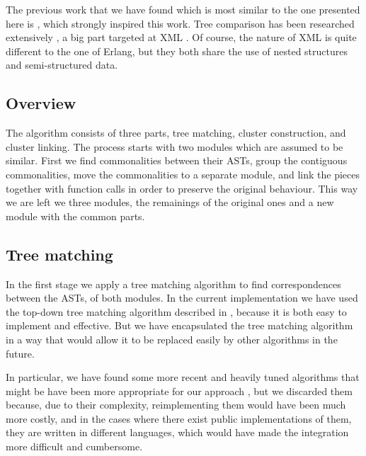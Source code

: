 The previous work that we have found which is most similar to the
one presented here is \cite{chawathe1996change}, which strongly
inspired this work. Tree comparison has been researched extensively
\cite{bille2005survey}, a big part targeted at XML \cite{peters2005change}.
Of course, the nature of XML is quite different to the one of Erlang,
but they both share the use of nested structures and semi-structured data.


\subsection{Overview}

The algorithm consists of three parts, tree matching, cluster construction,
and cluster linking. The process starts with two modules which are
assumed to be similar. First we find commonalities between their ASTs,
group the contiguous commonalities, move the commonalities to a separate
module, and link the pieces together with function calls in order
to preserve the original behaviour. This way we are left we three
modules, the remainings of the original ones and a new module with
the common parts.


\subsection{Tree matching\label{sub:tree-matching}}

In the first stage we apply a tree matching algorithm to find correspondences
between the ASTs, of both modules. In the current implementation we
have used the top-down tree matching algorithm described in \cite{al2005diffx},
because it is both easy to implement and effective. But we have encapsulated
the tree matching algorithm in a way that would allow it to be replaced
easily by other algorithms in the future.

In particular, we have found some more recent and heavily tuned algorithms
that might be have been more appropriate for our approach
\cite{falleri2014fine,fluri2007change}, but we
discarded them because, due to their complexity, reimplementing them would
have been much more costly, and in the cases where there exist public
implementations of them, they are written in different languages, which
would have made the integration more difficult and cumbersome.

